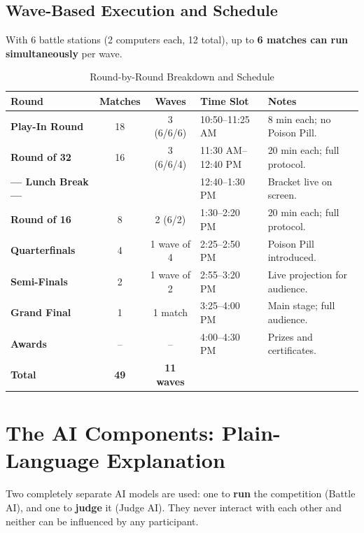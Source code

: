 \documentclass[11pt, a4paper]{article}
\begin{document}
\subsection{Wave-Based Execution and Schedule}

With 6 battle stations (2 computers each, 12 total), up to \textbf{6 matches can run simultaneously} per wave.

\begin{table}[H]
\centering
\renewcommand{\arraystretch}{1.3}
\begin{tabularx}{\textwidth}{>{\bfseries}l c c l X}
\toprule
Round & Matches & Waves & Time Slot & Notes \\
\midrule
Play-In Round  & 18 & 3 (6/6/6)   & 10:50--11:25 AM & 8 min each; no Poison Pill. \\
Round of 32    & 16 & 3 (6/6/4)   & 11:30 AM--12:40 PM & 20 min each; full protocol. \\
--- Lunch Break ---  & & & 12:40--1:30 PM & Bracket live on screen. \\
Round of 16    & 8  & 2 (6/2)     & 1:30--2:20 PM & 20 min each; full protocol. \\
Quarterfinals  & 4  & 1 wave of 4 & 2:25--2:50 PM & Poison Pill introduced. \\
Semi-Finals    & 2  & 1 wave of 2 & 2:55--3:20 PM & Live projection for audience. \\
Grand Final    & 1  & 1 match     & 3:25--4:00 PM & Main stage; full audience. \\
Awards         & -- & --          & 4:00--4:30 PM & Prizes and certificates. \\
\midrule
\textbf{Total} & \textbf{49} & \textbf{11 waves} & & \\
\bottomrule
\end{tabularx}
\caption{Round-by-Round Breakdown and Schedule}
\end{table}

\section{The AI Components: Plain-Language Explanation}

Two completely separate AI models are used: one to \textbf{run} the competition (Battle AI), and one to \textbf{judge} it (Judge AI). They never interact with each other and neither can be influenced by any participant.
\end{document}
